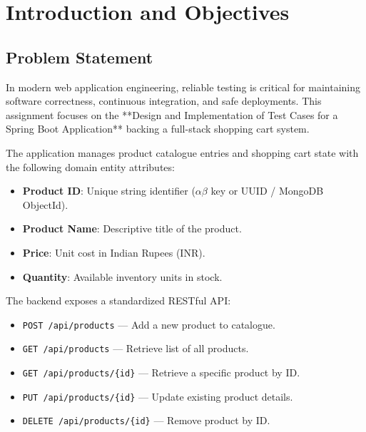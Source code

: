 \documentclass[12pt,a4paper]{article}
\begin{document}
\tableofcontents
\newpage

\section{Introduction and Objectives}

\subsection{Problem Statement}
In modern web application engineering, reliable testing is critical for maintaining software correctness, continuous integration, and safe deployments. This assignment focuses on the **Design and Implementation of Test Cases for a Spring Boot Application** backing a full-stack shopping cart system.

The application manages product catalogue entries and shopping cart state with the following domain entity attributes:
\begin{itemize}[leftmargin=2em]
  \item \textbf{Product ID}: Unique string identifier ($\alpha\beta$ key or UUID / MongoDB ObjectId).
  \item \textbf{Product Name}: Descriptive title of the product.
  \item \textbf{Price}: Unit cost in Indian Rupees (INR).
  \item \textbf{Quantity}: Available inventory units in stock.
\end{itemize}

The backend exposes a standardized RESTful API:
\begin{itemize}[leftmargin=2em]
  \item \texttt{POST /api/products} --- Add a new product to catalogue.
  \item \texttt{GET /api/products} --- Retrieve list of all products.
  \item \texttt{GET /api/products/\{id\}} --- Retrieve a specific product by ID.
  \item \texttt{PUT /api/products/\{id\}} --- Update existing product details.
  \item \texttt{DELETE /api/products/\{id\}} --- Remove product by ID.
\end{itemize}
\end{document}

